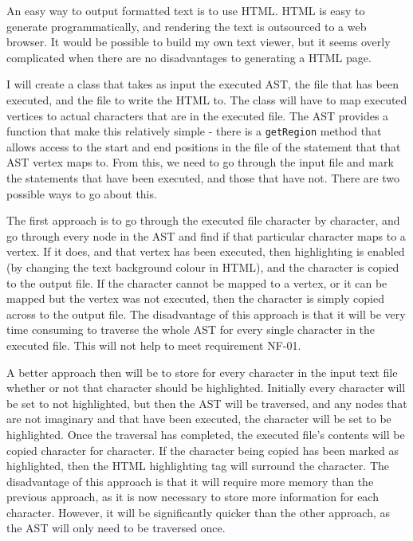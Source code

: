 An easy way to output formatted text is to use HTML. HTML is easy to generate programmatically, and rendering the text is outsourced to a web browser. It would be possible to build my own text viewer, but it seems overly complicated when there are no disadvantages to generating a HTML page.

I will create a class that takes as input the executed AST, the file that has been executed, and the file to write the HTML to. The class will have to map executed vertices to actual characters that are in the executed file. The AST provides a function that make this relatively simple - there is a \verb|getRegion| method that allows access to the start and end positions in the file of the statement that that AST vertex maps to. From this, we need to go through the input file and mark the statements that have been executed, and those that have not. There are two possible ways to go about this. 

The first approach is to go through the executed file character by character, and go through every node in the AST and find if that particular character maps to a vertex. If it does, and that vertex has been executed, then highlighting is enabled (by changing the text background colour in HTML), and the character is copied to the output file. If the character cannot be mapped to a vertex, or it can be mapped but the vertex was not executed, then the character is simply copied across to the output file. The disadvantage of this approach is that it will be very time consuming to traverse the whole AST for every single character in the executed file. This will not help to meet requirement NF-01.

A better approach then will be to store for every character in the input text file whether or not that character should be highlighted. Initially every character will be set to not highlighted, but then the AST will be traversed, and any nodes that are not imaginary and that have been executed, the character will be set to be highlighted. Once the traversal has completed, the executed file's contents will be copied character for character. If the character being copied has been marked as highlighted, then the HTML highlighting tag will surround the character. The disadvantage of this approach is that it will require more memory than the previous approach, as it is now necessary to store more information for each character. However, it will be significantly quicker than the other approach, as the AST will only need to be traversed once.

